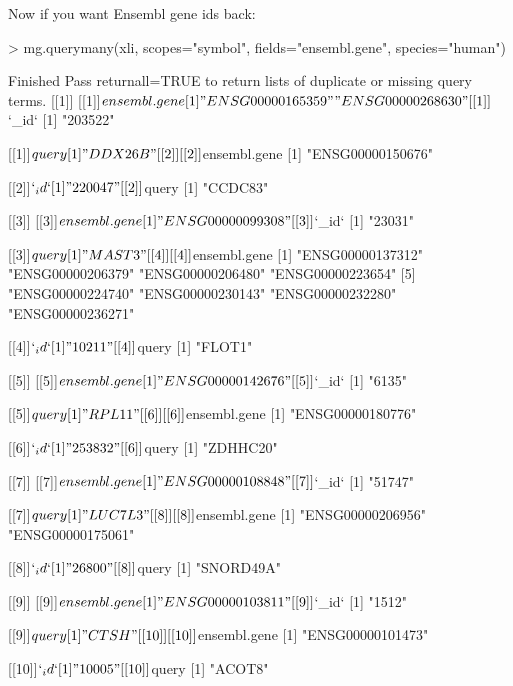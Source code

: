 \documentclass[12pt]{article}
\begin{document}
Now if you want Ensembl gene ids back:

\begin{Schunk}
\begin{Sinput}
> mg.querymany(xli, scopes="symbol", fields="ensembl.gene", species="human")
\end{Sinput}
\begin{Soutput}
Finished
Pass returnall=TRUE to return lists of duplicate or missing query terms.
[[1]]
[[1]]$ensembl.gene
[1] "ENSG00000165359" "ENSG00000268630"

[[1]]$`_id`
[1] "203522"

[[1]]$query
[1] "DDX26B"


[[2]]
[[2]]$ensembl.gene
[1] "ENSG00000150676"

[[2]]$`_id`
[1] "220047"

[[2]]$query
[1] "CCDC83"


[[3]]
[[3]]$ensembl.gene
[1] "ENSG00000099308"

[[3]]$`_id`
[1] "23031"

[[3]]$query
[1] "MAST3"


[[4]]
[[4]]$ensembl.gene
[1] "ENSG00000137312" "ENSG00000206379" "ENSG00000206480" "ENSG00000223654"
[5] "ENSG00000224740" "ENSG00000230143" "ENSG00000232280" "ENSG00000236271"

[[4]]$`_id`
[1] "10211"

[[4]]$query
[1] "FLOT1"


[[5]]
[[5]]$ensembl.gene
[1] "ENSG00000142676"

[[5]]$`_id`
[1] "6135"

[[5]]$query
[1] "RPL11"


[[6]]
[[6]]$ensembl.gene
[1] "ENSG00000180776"

[[6]]$`_id`
[1] "253832"

[[6]]$query
[1] "ZDHHC20"


[[7]]
[[7]]$ensembl.gene
[1] "ENSG00000108848"

[[7]]$`_id`
[1] "51747"

[[7]]$query
[1] "LUC7L3"


[[8]]
[[8]]$ensembl.gene
[1] "ENSG00000206956" "ENSG00000175061"

[[8]]$`_id`
[1] "26800"

[[8]]$query
[1] "SNORD49A"


[[9]]
[[9]]$ensembl.gene
[1] "ENSG00000103811"

[[9]]$`_id`
[1] "1512"

[[9]]$query
[1] "CTSH"


[[10]]
[[10]]$ensembl.gene
[1] "ENSG00000101473"

[[10]]$`_id`
[1] "10005"

[[10]]$query
[1] "ACOT8"
\end{Soutput}
\end{Schunk}
\end{document}
